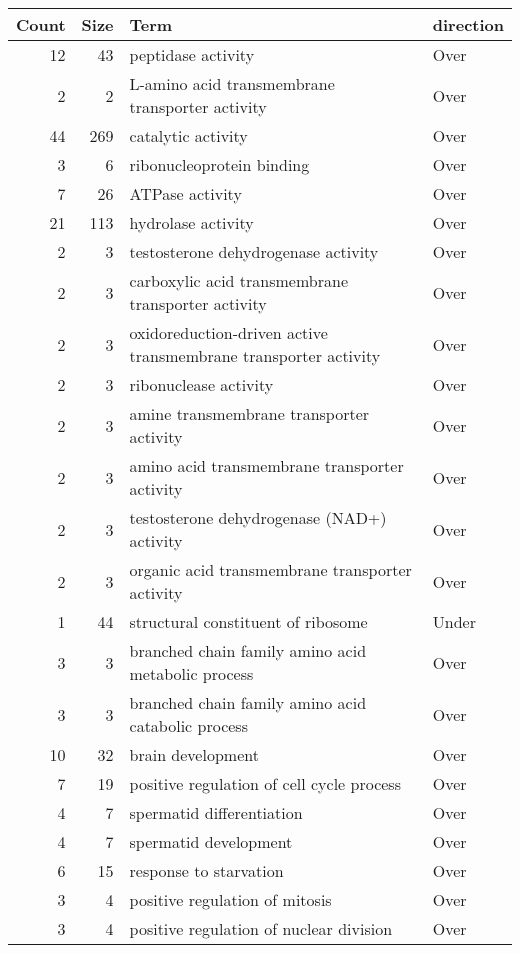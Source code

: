 \documentclass[10pt]{bmc_article}
\newenvironment{bmcformat}{\begin{raggedright}\baselineskip20pt\sloppy\setboolean{publ}{false}}{\end{raggedright}\baselineskip20pt\sloppy}
\begin{document}
\begin{bmcformat}
\begin{longtable}{rrll}
 Count & Size & Term & direction \\ 
  \hline
 12 &  43 & peptidase activity & Over \\ 
    2 &   2 & L-amino acid transmembrane transporter activity & Over \\ 
   44 & 269 & catalytic activity & Over \\ 
    3 &   6 & ribonucleoprotein binding & Over \\ 
    7 &  26 & ATPase activity & Over \\ 
   21 & 113 & hydrolase activity & Over \\ 
    2 &   3 & testosterone dehydrogenase activity & Over \\ 
    2 &   3 & carboxylic acid transmembrane transporter activity & Over \\ 
    2 &   3 & oxidoreduction-driven active transmembrane transporter activity & Over \\ 
    2 &   3 & ribonuclease activity & Over \\ 
    2 &   3 & amine transmembrane transporter activity & Over \\ 
    2 &   3 & amino acid transmembrane transporter activity & Over \\ 
    2 &   3 & testosterone dehydrogenase (NAD+) activity & Over \\ 
    2 &   3 & organic acid transmembrane transporter activity & Over \\ 
    1 &  44 & structural constituent of ribosome & Under \\ 
   \hline
  3 &   3 & branched chain family amino acid metabolic process & Over \\ 
    3 &   3 & branched chain family amino acid catabolic process & Over \\ 
   10 &  32 & brain development & Over \\ 
    7 &  19 & positive regulation of cell cycle process & Over \\ 
    4 &   7 & spermatid differentiation & Over \\ 
    4 &   7 & spermatid development & Over \\ 
    6 &  15 & response to starvation & Over \\ 
    3 &   4 & positive regulation of mitosis & Over \\ 
    3 &   4 & positive regulation of nuclear division & Over \\ 

\end{longtable}
\end{bmcformat}
\end{document}
